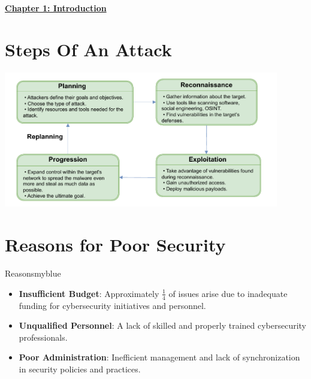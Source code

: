 \begin{center}
    \Huge{\textbf{\underline{Chapter 1: Introduction}}}
\end{center}

\setcounter{section}{0}

\vspace{0.35cm}

\section{Steps Of An Attack}

\vspace{0.25cm}
\begin{center}
    \includegraphics[width=0.9\textwidth]{Chapters/Diagram/Introduction/attack.drawio.pdf}
\end{center}

\vspace{0.35cm}
\section{Reasons for Poor Security}
\begin{prettyBox}{Reasons}{myblue}
\begin{itemize}
    \item \textbf{Insufficient Budget}: Approximately \(\frac{1}{4}\) of issues arise due to inadequate funding for cybersecurity initiatives and personnel.
    \item \textbf{Unqualified Personnel}: A lack of skilled and properly trained cybersecurity professionals.
    \item \textbf{Poor Administration}: Inefficient management and lack of synchronization in security policies and practices.
\end{itemize}
\end{prettyBox}

\vspace{0.35cm}

